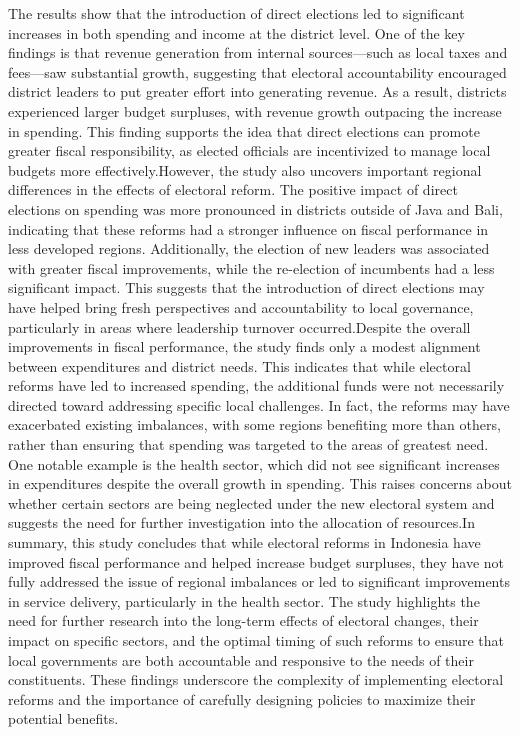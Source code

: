 The results show that the introduction of direct elections led to significant increases in both spending and income at the district level. One of the key findings is that revenue generation from internal sources—such as local taxes and fees—saw substantial growth, suggesting that electoral accountability encouraged district leaders to put greater effort into generating revenue. As a result, districts experienced larger budget surpluses, with revenue growth outpacing the increase in spending. This finding supports the idea that direct elections can promote greater fiscal responsibility, as elected officials are incentivized to manage local budgets more effectively.However, the study also uncovers important regional differences in the effects of electoral reform. The positive impact of direct elections on spending was more pronounced in districts outside of Java and Bali, indicating that these reforms had a stronger influence on fiscal performance in less developed regions. Additionally, the election of new leaders was associated with greater fiscal improvements, while the re-election of incumbents had a less significant impact. This suggests that the introduction of direct elections may have helped bring fresh perspectives and accountability to local governance, particularly in areas where leadership turnover occurred.Despite the overall improvements in fiscal performance, the study finds only a modest alignment between expenditures and district needs. This indicates that while electoral reforms have led to increased spending, the additional funds were not necessarily directed toward addressing specific local challenges. In fact, the reforms may have exacerbated existing imbalances, with some regions benefiting more than others, rather than ensuring that spending was targeted to the areas of greatest need. One notable example is the health sector, which did not see significant increases in expenditures despite the overall growth in spending. This raises concerns about whether certain sectors are being neglected under the new electoral system and suggests the need for further investigation into the allocation of resources.In summary, this study concludes that while electoral reforms in Indonesia have improved fiscal performance and helped increase budget surpluses, they have not fully addressed the issue of regional imbalances or led to significant improvements in service delivery, particularly in the health sector. The study highlights the need for further research into the long-term effects of electoral changes, their impact on specific sectors, and the optimal timing of such reforms to ensure that local governments are both accountable and responsive to the needs of their constituents. These findings underscore the complexity of implementing electoral reforms and the importance of carefully designing policies to maximize their potential benefits. \\
